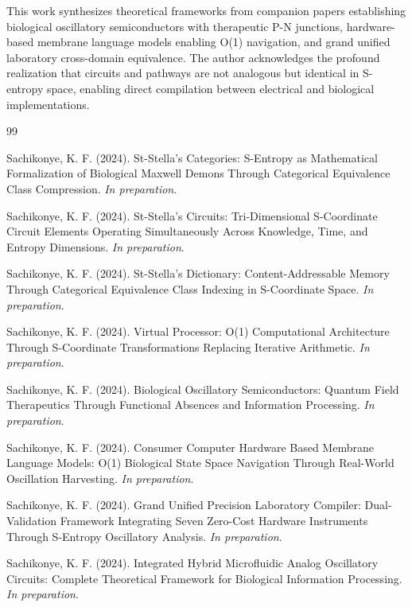 \documentclass[11pt,a4paper]{article}
\begin{document}
This work synthesizes theoretical frameworks from companion papers establishing biological oscillatory semiconductors with therapeutic P-N junctions, hardware-based membrane language models enabling O(1) navigation, and grand unified laboratory cross-domain equivalence. The author acknowledges the profound realization that circuits and pathways are not analogous but identical in S-entropy space, enabling direct compilation between electrical and biological implementations.


\begin{thebibliography}{99}

Sachikonye, K. F. (2024). St-Stella's Categories: S-Entropy as Mathematical Formalization of Biological Maxwell Demons Through Categorical Equivalence Class Compression. \textit{In preparation}.

Sachikonye, K. F. (2024). St-Stella's Circuits: Tri-Dimensional S-Coordinate Circuit Elements Operating Simultaneously Across Knowledge, Time, and Entropy Dimensions. \textit{In preparation}.

Sachikonye, K. F. (2024). St-Stella's Dictionary: Content-Addressable Memory Through Categorical Equivalence Class Indexing in S-Coordinate Space. \textit{In preparation}.

Sachikonye, K. F. (2024). Virtual Processor: O(1) Computational Architecture Through S-Coordinate Transformations Replacing Iterative Arithmetic. \textit{In preparation}.

Sachikonye, K. F. (2024). Biological Oscillatory Semiconductors: Quantum Field Therapeutics Through Functional Absences and Information Processing. \textit{In preparation}.

Sachikonye, K. F. (2024). Consumer Computer Hardware Based Membrane Language Models: O(1) Biological State Space Navigation Through Real-World Oscillation Harvesting. \textit{In preparation}.

Sachikonye, K. F. (2024). Grand Unified Precision Laboratory Compiler: Dual-Validation Framework Integrating Seven Zero-Cost Hardware Instruments Through S-Entropy Oscillatory Analysis. \textit{In preparation}.

Sachikonye, K. F. (2024). Integrated Hybrid Microfluidic Analog Oscillatory Circuits: Complete Theoretical Framework for Biological Information Processing. \textit{In preparation}.

\end{thebibliography}
\end{document}
